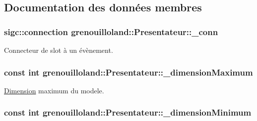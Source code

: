 \subsection{Documentation des données membres}
\hypertarget{classgrenouilloland_1_1Presentateur_adecdbfff3ad277099345f4e768f95e50}{
\subsubsection[{\-\_\-conn}]{\setlength{\rightskip}{0pt plus 5cm}sigc\-::connection grenouilloland\-::\-Presentateur\-::\-\_\-conn\hspace{0.3cm}{\ttfamily [protected]}}}\label{classgrenouilloland_1_1Presentateur_adecdbfff3ad277099345f4e768f95e50}
Connecteur de slot à un évènement. \hypertarget{classgrenouilloland_1_1Presentateur_a8d205215e5a4880713eb016dd1266a20}{
\subsubsection[{\-\_\-dimension\-Maximum}]{\setlength{\rightskip}{0pt plus 5cm}const int grenouilloland\-::\-Presentateur\-::\-\_\-dimension\-Maximum\hspace{0.3cm}{\ttfamily [protected]}}}\label{classgrenouilloland_1_1Presentateur_a8d205215e5a4880713eb016dd1266a20}
\hyperlink{classgrenouilloland_1_1Dimension}{Dimension} maximum du modele. \hypertarget{classgrenouilloland_1_1Presentateur_a94ac9459edd7299793d43196d42575f2}{
\subsubsection[{\-\_\-dimension\-Minimum}]{\setlength{\rightskip}{0pt plus 5cm}const int grenouilloland\-::\-Presentateur\-::\-\_\-dimension\-Minimum\hspace{0.3cm}{\ttfamily [protected]}}}\label{classgrenouilloland_1_1Presentateur_a94ac9459edd7299793d43196d42575f2}
